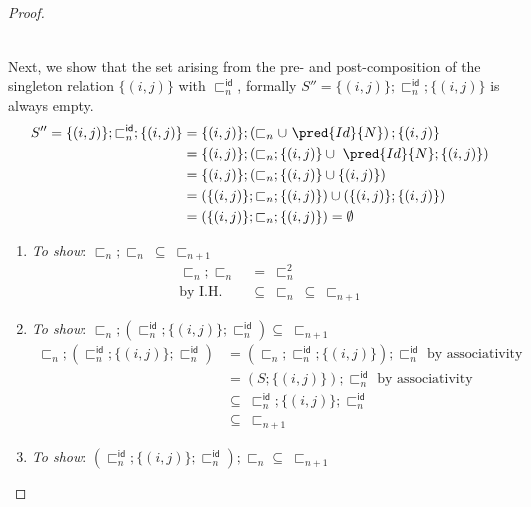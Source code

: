 \begin{lem}
{\begin{proof}
\[\begin{array}{l @{\hspace{50pt}} l}
\begin{aligned}
				\end{aligned}
		\end{array}
	\]
	Next, we show that the set arising from the pre- and post-composition of the singleton relation $\{(i,j)\}$ with $\sqsubset_n^\mathsf{id}$, formally $S'' = \{ (i, j) \} ; \sqsubset_n^\mathsf{id} ; \{ (i, j) \}$ is always empty.
	\begin{align*}
		S'' = 
		\{ (i, j) \} ; \sqsubset_n^\mathsf{id} ; \{ (i, j) \}
			&=
		\{ (i, j) \} ; \left( \sqsubset_n \cup\ \pred{Id}{N} \right) ; \{ (i, j) \} \\
			&=
		\{ (i, j) \} ; \left( \sqsubset_n  ; \{ (i, j) \} \cup\ \pred{Id}{N}  ; \{ (i, j) \} \right) \\
			&=
		\{ (i, j) \} ; \left( \sqsubset_n ; \{ (i, j) \} \cup \{ (i, j) \} \right) \\
			&=
		\left( \{ (i, j) \} ; \sqsubset_n ; \{ (i, j) \} \right) \cup \left(\{ (i, j) \} ; \{ (i, j) \} \right) \\
		 	&=
		 \left( \{ (i, j) \} ; \sqsubset_n ; \{ (i, j) \} \right) = \emptyset
	\end{align*}
	\begin{enumerate}[label=\alph*)]
		\item \textit{To show}: $\sqsubset_n ; \sqsubset_n\ \subseteq\ \sqsubset_{n + 1}$
			\begin{align*}
				\sqsubset_n ; \sqsubset_n\ &=\ \sqsubset_n^2 \\
				\text{by I.H.}&\subseteq\ \sqsubset_n\ \subseteq\ \sqsubset_{n + 1}
			\end{align*}
		\item \textit{To show}: $\sqsubset_n ; \left( \sqsubset_n^\mathsf{id} ; \{ (i, j) \} ; \sqsubset_n^\mathsf{id} \right) \subseteq\ \sqsubset_{n + 1}$
			\begin{align*}
				\sqsubset_n ; \left( \sqsubset_n^\mathsf{id} ; \{ (i, j) \} ; \sqsubset_n^\mathsf{id} \right) &= \left( \sqsubset_n ; \sqsubset_n^\mathsf{id} ; \{ (i, j) \} \right) ; \sqsubset_n^\mathsf{id} \text{ by associativity} \\
				&= \left( S ; \{ (i, j) \} \right) ; \sqsubset_n^\mathsf{id} \text{ by associativity} \\
				&\subseteq\ \sqsubset_n^\mathsf{id} ; \{ (i, j) \} ; \sqsubset_n^\mathsf{id} \\
				&\subseteq\ \sqsubset_{n + 1}
			\end{align*}
		\item \textit{To show}: $\left( \sqsubset_n^\mathsf{id} ; \{ (i, j) \} ; \sqsubset_n^\mathsf{id} \right) ; \sqsubset_n \subseteq\ \sqsubset_{n + 1}$

\end{enumerate}
\end{proof}}
\end{lem}
